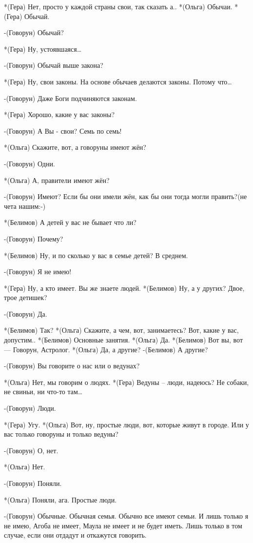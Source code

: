*(Гера) Нет, просто у каждой страны свои, так сказать а.. 
*(Ольга) Обычаи.
*(Гера) Обычай.

-(Говорун) Обычай?

*(Гера) Ну, устоявшаяся…

-(Говорун) Обычай выше закона?

*(Гера) Ну, свои законы. На основе обычаев делаются законы. Потому что…

-(Говорун) Даже Боги подчиняются законам.

*(Гера) Хорошо, какие у вас законы?

-(Говорун) А Вы - свои? Семь по семь!

*(Ольга) Скажите, вот, а говоруны имеют жён?

-(Говорун) Одни.

*(Ольга) А, правители имеют жён?

-(Говорун) Имеют? Если бы они имели жён, как бы они тогда могли править?(не чета нашим:-)

*(Белимов) А детей у вас не бывает что ли?

-(Говорун) Почему?

*(Белимов) Ну, и по сколько у вас в семье детей? В среднем.

-(Говорун) Я не имею!

*(Гера) Ну, а кто имеет. Вы же знаете людей.
*(Белимов) Ну, а у других? Двое, трое детишек?

-(Говорун) Да.

*(Белимов) Так?
*(Ольга) Скажите, а чем, вот, занимаетесь? Вот, какие у вас, допустим..
*(Белимов) Основные занятия. 
*(Ольга) Да.
*(Белимов) Вот вы, вот — Говорун, Астролог.
*(Ольга) Да, а другие?
-(Белимов) А другие?

-(Говорун) Вы говорите о нас или о ведунах?

*(Ольга) Нет, мы говорим о людях.
*(Гера) Ведуны – люди, надеюсь? Не собаки, не свиньи, ни что-то там…

-(Говорун) Люди.

*(Гера) Угу.
*(Ольга) Вот, ну, простые люди, вот, которые живут в городе.  Или у вас только говоруны и только ведуны?

-(Говорун) О, нет.

*(Ольга) Нет.

-(Говорун) Поняли.

*(Ольга) Поняли, ага. Простые люди.

-(Говорун) Обычные. Обычная семья. Обычно все имеют семьи. И лишь только я не имею, Агоба не имеет, Маула не имеет и не будет иметь. Лишь только в том случае, если они отдадут и откажутся говорить.

